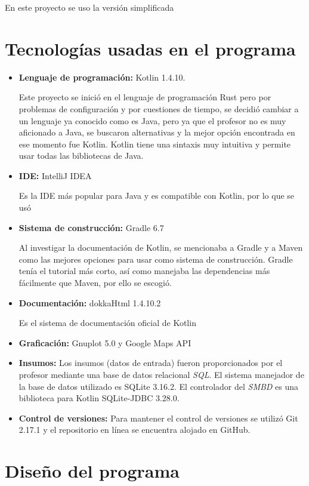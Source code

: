 \documentclass{article}
\begin{document}
En este proyecto se uso la versión simplificada 

\section{Tecnologías usadas en el programa}
\begin{itemize}
	\item{ \textbf{Lenguaje de programación:} Kotlin 1.4.10. 
		
	Este proyecto se inició en el lenguaje de programación Rust pero por problemas de configuración y por cuestiones de tiempo, se decidió cambiar a un lenguaje ya conocido como es Java, pero ya que el profesor no es muy aficionado a Java, se buscaron alternativas y la mejor opción encontrada en ese momento fue Kotlin. Kotlin tiene una sintaxis muy intuitiva y permite usar todas las bibliotecas de Java.}
	\item {\textbf{IDE:} IntelliJ IDEA
		
	Es la IDE más popular para Java y es compatible con Kotlin, por lo que se usó}
	\item {\textbf{Sistema de construcción:} Gradle 6.7
		
	Al investigar la documentación de Kotlin, se mencionaba a Gradle y a Maven como las mejores opciones para usar como sistema de construcción. Gradle tenía el tutorial más corto, así como manejaba las dependencias más fácilmente que Maven, por ello se escogió.
	}
	\item {\textbf{Documentación:} dokkaHtml 1.4.10.2  
	
	Es el sistema de documentación oficial de Kotlin}
	\item {\textbf{Graficación:} Gnuplot 5.0 y Google Maps API}
	\item {\textbf{Insumos:} Los insumos (datos de entrada) fueron proporcionados por el profesor mediante una base de datos relacional \textit{SQL}. El sistema manejador de la base de datos utilizado es SQLite 3.16.2. El controlador del \textit{SMBD} es una biblioteca para Kotlin SQLite-JDBC 3.28.0.}
	\item {\textbf{Control de versiones:} Para mantener el control de versiones se utilizó Git 2.17.1 y el repositorio en línea se encuentra alojado en GitHub.}
\end{itemize}

\section{Diseño del programa}
\end{document}
